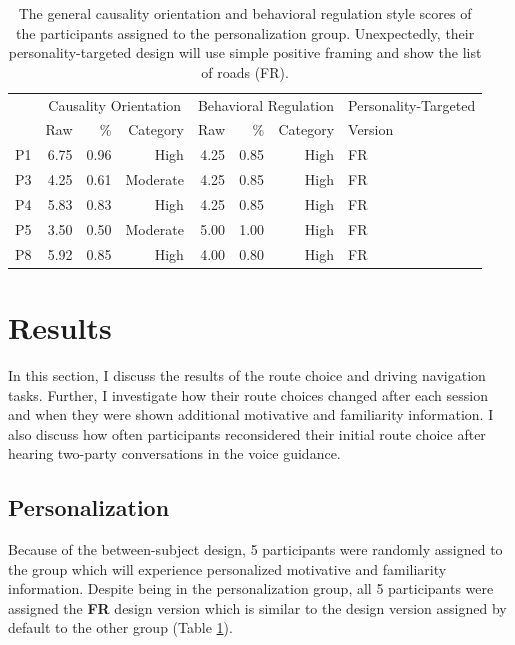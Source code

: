 \begin{table}[ht]
	\centering
	\caption{The general causality orientation and behavioral regulation style scores of the participants assigned to the personalization group. Unexpectedly, their personality-targeted design will use simple positive framing and show the list of roads (FR).}
	\begin{tabular}{l r r r r r r l}
		\toprule
		& \multicolumn{3}{c}{Causality Orientation} & \multicolumn{3}{c}{Behavioral Regulation} & Personality-Targeted\\
		& Raw & \% & Category & Raw & \% & Category & Version\\
		\midrule
		P1 & 6.75 & 0.96 & High & 4.25 & 0.85 & High & FR	\\ 
        P3 & 4.25 & 0.61 & Moderate & 4.25 & 0.85 & High & FR	\\ 
        P4 & 5.83 & 0.83 & High & 4.25 & 0.85 & High & FR	\\ 
        P5 & 3.50 & 0.50 & Moderate & 5.00 & 1.00 & High & FR	\\ 
        P8 & 5.92 & 0.85 & High & 4.00 & 0.80 & High & FR	\\ 
		\bottomrule
	\end{tabular}
	\label{tab:s4-personalization}
\end{table}

\section{Results}
In this section, I discuss the results of the route choice and driving navigation tasks. Further, I investigate how their route choices changed after each session and when they were shown additional motivative and familiarity information. I also discuss how often participants reconsidered their initial route choice after hearing two-party conversations in the voice guidance. 

\subsection{Personalization}
Because of the between-subject design, 5 participants were randomly assigned to the group which will experience personalized motivative and familiarity information. Despite being in the personalization group, all 5 participants were assigned the \textbf{FR} design version which is similar to the design version assigned by default to the other group (Table \ref{tab:s4-personalization}). 

